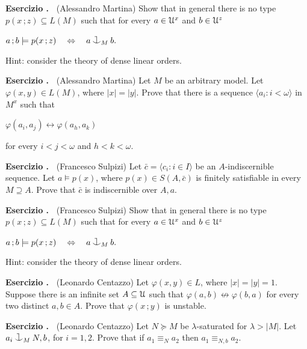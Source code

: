 \documentclass[10pt]{article}
\def\phi{\varphi}
\def\U{\EuScript U}
\def\niff{\nleftrightarrow}
\def\iff{\leftrightarrow}
\def\IFF{\Leftrightarrow}
\def\cnonfork{\mathbin{\raise1.8ex\rlap{\kern0.6ex\rule{0.6ex}{0.1ex}}\rlap{\kern1.1ex\rule{0.1ex}{1.9ex}}\raise-0.3ex\hbox{$\smile$} } }
\newcounter{ex}
\newenvironment{exercise}{\bigskip\par\addtocounter{ex}{1}\textbf{Esercizio \theex.\ }}{}
\begin{document}
\begin{exercise}
  (Alessandro Martina)
  Show that in general there is no type $p(x\,;z)\subseteq L(M)$ such that for every  $a\in\U^x$ and $b\in\U^z$\vspace*{-1ex}

  \hfil$a\,;b\models p(x\,;z)\ \ \ \IFF\ \ \ a\cnonfork_M b.$\vspace*{-1ex}

  Hint: consider the theory of dense linear orders.
\end{exercise}
\begin{exercise} 
  (Alessandro Martina)
  Let $M$ be an arbitrary model.
  Let $\phi(x,y)\in L(M)$, where $|x|=|y|$.
  Prove that there is a sequence $\langle a_i:i<\omega\rangle$ in $M^{x}$ such that\vspace*{-1ex}

  \hfil$\phi(a_i,a_j)\iff\phi(a_h,a_k)$\vspace*{-1ex}

  for every $i<j<\omega$ and $h<k<\omega$.
\end{exercise}
\begin{exercise} 
  (Francesco Sulpizi)
  Let $\bar c=\langle c_i:i\in I\rangle$ be an $A$-indiscernible sequence.
  Let $a\models p(x)$, where $p(x)\in S(A,\bar c)$ is finitely satisfiable in every $M\supseteq A$.
  Prove that $\bar c$ is indiscernible over $A,a$.
\end{exercise}
\begin{exercise}
  (Francesco Sulpizi)
  Show that in general there is no type $p(x\,;z)\subseteq L(M)$ such that for every  $a\in\U^x$ and $b\in\U^z$\vspace*{-1ex}

  \hfil$a\,;b\models p(x\,;z)\ \ \ \IFF\ \ \ a\cnonfork_M b.$\vspace*{-1ex}

  Hint: consider the theory of dense linear orders.
\end{exercise}
\begin{exercise}
  (Leonardo Centazzo)
  Let $\phi(x,y)\in  L$, where $|x|=|y|=1$.
  Suppose there is an infinite set $A\subseteq\U$ such that $\phi(a,b)\niff\phi(b,a)$ for every two distinct $a,b\in A$.
  Prove that $\phi(x\,;y)$ is unstable.
\end{exercise}
\begin{exercise}
  (Leonardo Centazzo)
  Let $N\succeq M$ be $\lambda$-saturated for $\lambda>|M|$.
  Let $a_i\cnonfork_M N,b$, for $i=1,2$.
  Prove that if $a_1\equiv_N a_2$ then $a_1\equiv_{N,b} a_2$.
\end{exercise}
\end{document}
